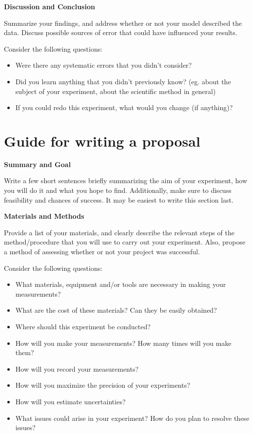 \textbf{Discussion and Conclusion}

Summarize your findings, and address whether or not your model described the data. Discuss possible sources of error that could have influenced your results.

Consider the following questions:
\begin{itemize}
\item Were there any systematic errors that you didn't consider?
\item Did you learn anything that you didn't previously know? (eg. about the subject of your experiment, about the scientific method in general)
\item If you could redo this experiment, what would you change (if anything)?
\end{itemize}

\newpage
\section{Guide for writing a proposal}
 \vspace{0.25cm}
\textbf{Summary and Goal}

Write a few short sentences briefly summarizing the aim of your experiment, how you will do it and what you hope to find. Additionally, make sure to discuss feasibility and chances of success. It may be easiest to write this section last.

\textbf{Materials and Methods}

Provide a list of your materials, and clearly describe the relevant steps of the method/procedure that you will use to carry out your experiment. Also, propose a method of assessing whether or not your project was successful. 

Consider the following questions:
\begin{itemize}
\item What materials, equipment and/or tools are necessary in making your measurements?
\item What are the cost of these materials? Can they be easily obtained?
\item Where should this experiment be conducted?
\item How will you make your measurements? How many times will you make them?
\item How will you record your measurements?
\item How will you maximize the precision of your experiments?
\item How will you estimate uncertainties?
\item What issues could arise in your experiment? How do you plan to resolve these issues?
\end{itemize}

